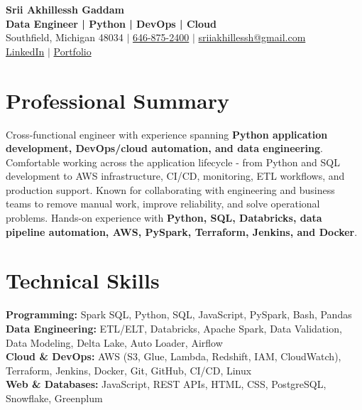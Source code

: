\documentclass[letterpaper,10pt]{article}
\begin{document}
\fontsize{9.35pt}{10.45pt}\selectfont

\begin{center}
    {\LARGE \textbf{Srii Akhillessh Gaddam}} \\[-1pt]
    \textbf{Data Engineer | Python | DevOps | Cloud} \\[2pt]
    Southfield, Michigan 48034 $|$
    \href{tel:6468752400}{646-875-2400} $|$
    \href{mailto:sriiakhillessh@gmail.com}{sriiakhillessh@gmail.com} \\[1pt]
    \href{https://www.linkedin.com/in/srii-akhiilessh-gaddam-b48668191/}{LinkedIn} $|$
    \href{https://sriiakhillesshg.github.io/portfolio/}{Portfolio}
\end{center}
\vspace{-8pt}

\section{Professional Summary}
\small{Cross-functional engineer with experience spanning \textbf{Python application development, DevOps/cloud automation, and data engineering}. Comfortable working across the application lifecycle - from Python and SQL development to AWS infrastructure, CI/CD, monitoring, ETL workflows, and production support. Known for collaborating with engineering and business teams to remove manual work, improve reliability, and solve operational problems. Hands-on experience with \textbf{Python, SQL, Databricks, data pipeline automation, AWS, PySpark, Terraform, Jenkins, and Docker}.}

\section{Technical Skills}
\small{
\textbf{Programming:} Spark SQL, Python, SQL, JavaScript, PySpark, Bash, Pandas \\
\textbf{Data Engineering:} ETL/ELT, Databricks, Apache Spark, Data Validation, Data Modeling, Delta Lake, Auto Loader, Airflow \\
\textbf{Cloud \& DevOps:} AWS (S3, Glue, Lambda, Redshift, IAM, CloudWatch), Terraform, Jenkins, Docker, Git, GitHub, CI/CD, Linux \\
\textbf{Web \& Databases:} JavaScript, REST APIs, HTML, CSS, PostgreSQL, Snowflake, Greenplum
}

\end{document}

